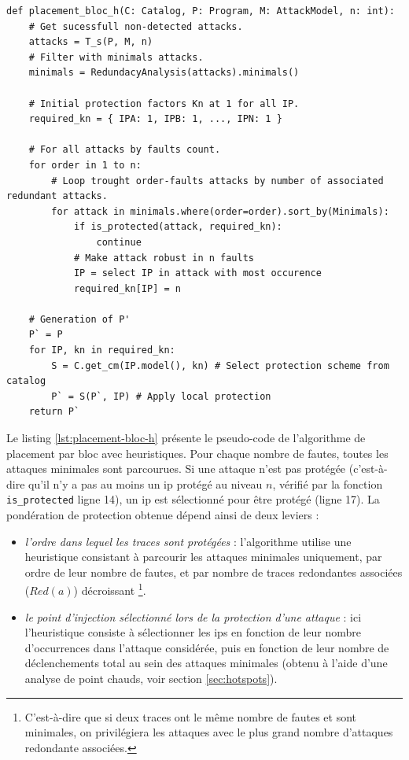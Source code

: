 \begin{lstlisting}
def placement_bloc_h(C: Catalog, P: Program, M: AttackModel, n: int):
    # Get sucessfull non-detected attacks.
    attacks = T_s(P, M, n)
    # Filter with minimals attacks.
    minimals = RedundacyAnalysis(attacks).minimals()
    
    # Initial protection factors Kn at 1 for all IP.
    required_kn = { IPA: 1, IPB: 1, ..., IPN: 1 }
            
    # For all attacks by faults count.
    for order in 1 to n:
        # Loop trought order-faults attacks by number of associated redundant attacks.
        for attack in minimals.where(order=order).sort_by(Minimals):
            if is_protected(attack, required_kn):
                continue
            # Make attack robust in n faults
            IP = select IP in attack with most occurence
            required_kn[IP] = n

    # Generation of P'
    P` = P
    for IP, kn in required_kn:
        S = C.get_cm(IP.model(), kn) # Select protection scheme from catalog
        P` = S(P`, IP) # Apply local protection        
    return P`
\end{lstlisting}  

            Le listing \ref{lst:placement-bloc-h} présente le pseudo-code de l'algorithme de placement par bloc avec heuristiques. 
            Pour chaque nombre de fautes, toutes les attaques minimales sont parcourues.
            Si une attaque n'est pas protégée (c'est-à-dire qu'il n'y a pas au moins un \gls{ip} protégé au niveau $n$, vérifié par la fonction \texttt{is\_protected} ligne 14), un \gls{ip} est sélectionné pour être protégé (ligne 17).
            La pondération de protection obtenue dépend ainsi de deux leviers :
            \begin{itemize}
                \item \textit{l'ordre dans lequel les traces sont protégées} : l'algorithme utilise une heuristique consistant à parcourir les attaques minimales uniquement, par ordre de leur nombre de fautes, et par nombre de traces redondantes associées ($Red(a)$) décroissant \footnote{C'est-à-dire que si deux traces ont le même nombre de fautes et sont minimales, on privilégiera les attaques avec le plus grand nombre d'attaques redondante associées.}. 
                \item \textit{le point d'injection sélectionné lors de la protection d'une attaque} : ici l'heuristique consiste à sélectionner les \gls{ip}s en fonction de leur nombre d'occurrences dans l'attaque considérée, puis en fonction de leur nombre de déclenchements total au sein des attaques minimales (obtenu à l'aide d'une analyse de point chauds, voir section \ref{sec:hotspots}).  
            \end{itemize}
            
